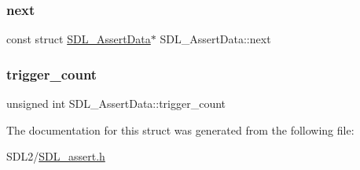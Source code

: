 \mbox{\label{struct_s_d_l___assert_data_a2081dcf06dce4df497e423bccddfc099}} 
\subsubsection{\texorpdfstring{next}{next}}
{\footnotesize\ttfamily const struct \hyperlink{struct_s_d_l___assert_data}{S\+D\+L\+\_\+\+Assert\+Data}$\ast$ S\+D\+L\+\_\+\+Assert\+Data\+::next}

\mbox{\label{struct_s_d_l___assert_data_a230bbcc2d115aab04cf817773e08eb5b}} 
\subsubsection{\texorpdfstring{trigger\+\_\+count}{trigger\_count}}
{\footnotesize\ttfamily unsigned int S\+D\+L\+\_\+\+Assert\+Data\+::trigger\+\_\+count}



The documentation for this struct was generated from the following file\+:\begin{DoxyCompactItemize}
\item 
S\+D\+L2/\hyperlink{_s_d_l__assert_8h}{S\+D\+L\+\_\+assert.\+h}\end{DoxyCompactItemize}
